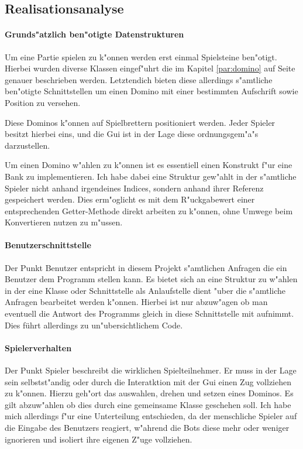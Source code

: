 \newpage
\subsection{Realisationsanalyse}
\paragraph{Grunds"atzlich ben"otigte Datenstrukturen}
Um eine Partie spielen zu k"onnen werden erst einmal Spielsteine ben"otigt. Hierbei wurden diverse Klassen eingef"uhrt die im Kapitel  \ref{par:domino} auf Seite \pageref{par:domino}
genauer beschrieben werden. Letztendich bieten diese allerdings s"amtliche ben"otigte Schnittstellen um einen Domino mit einer bestimmten Aufschrift sowie Position zu versehen. 

Diese Dominos k"onnen auf Spielbrettern positioniert werden. Jeder Spieler besitzt hierbei eins, und die Gui ist in der Lage diese ordnungsgem"a"s darzustellen. 

Um einen Domino w"ahlen zu k"onnen ist es essentiell einen Konstrukt f"ur eine Bank zu implementieren. Ich habe dabei eine Struktur gew"ahlt in der s"amtliche Spieler nicht anhand irgendeines Indices, sondern anhand ihrer Referenz gespeichert werden. Dies erm"oglicht es mit dem R"uckgabewert einer entsprechenden Getter-Methode direkt arbeiten zu k"onnen, ohne Umwege beim Konvertieren nutzen zu m"ussen. 

\paragraph{Benutzerschnittstelle}
Der Punkt Benutzer entspricht in diesem Projekt s"amtlichen Anfragen die ein Benutzer dem Programm stellen kann. Es bietet sich an eine Struktur zu w"ahlen in der eine Klasse oder Schnittstelle als Anlaufstelle dient "uber die s"amtliche Anfragen bearbeitet werden k"onnen. Hierbei ist nur abzuw"agen ob man eventuell die \glqq Antwort\grqq {} des Programms gleich in diese Schnittstelle mit aufnimmt. Dies führt allerdings zu un"ubersichtlichem Code. 

\paragraph{Spielerverhalten}
Der Punkt Spieler beschreibt die wirklichen Spielteilnehmer. Er muss in der Lage sein selbstst"andig oder durch die Interatktion mit der Gui einen Zug vollziehen zu k"onnen. Hierzu geh"ort das auswahlen, drehen und setzen eines Dominos. Es gilt abzuw"ahlen ob dies durch eine gemeinsame Klasse geschehen soll. Ich habe mich allerdings f"ur eine Unterteilung entschieden, da der menschliche Spieler auf die Eingabe des Benutzers reagiert, w"ahrend die Bots diese mehr oder weniger ignorieren und isoliert ihre eigenen Z"uge vollziehen. 

